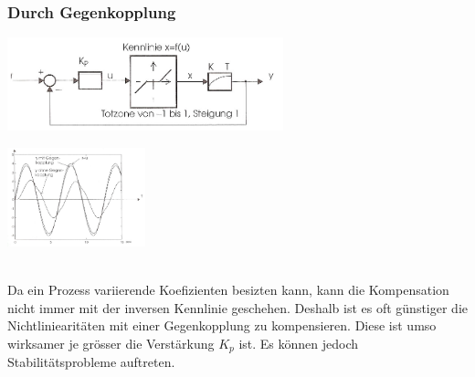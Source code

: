 		\subsubsection{Durch Gegenkopplung }
				\begin{minipage}{11cm}
			\includegraphics[width=8cm]{./bilder/Gegenkopplung.jpg}
        \end{minipage}
		\begin{minipage}{9cm}
        	\includegraphics[width=4cm]{./bilder/Gegenkopplung_dia.jpg}
        \end{minipage}\\
			Da ein Prozess variierende Koefizienten besizten kann, kann die Kompensation
			nicht immer mit der inversen Kennlinie geschehen. Deshalb ist es oft
			günstiger die Nichtliniearitäten mit einer Gegenkopplung zu kompensieren.
			Diese ist umso wirksamer je grösser die Verstärkung $K_p$ ist.
			Es können jedoch Stabilitätsprobleme auftreten.

